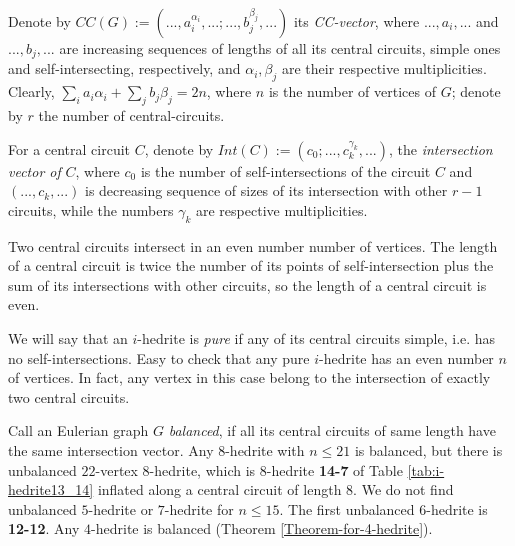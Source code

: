 \documentclass[12pt]{article}
\begin{document}


Denote by 
$CC(G):=(...,a_i^{\alpha_i},...;...,b_j^{\beta_j},...)$ its {\it CC-vector}, 
where $...,a_i,...$ and  $...,b_j,...$ are increasing sequences of lengths of 
all its central circuits, simple ones and self-intersecting, respectively, 
and $\alpha_i, \beta_j$ are their respective multiplicities.
Clearly, $\sum_{i} a_i{\alpha_i}+ \sum_{j} b_j{\beta_j}=2n$, where 
$n$ is the number of vertices of $G$; denote by $r$ the number of 
central-circuits.


For a central circuit $C$, denote by $Int(C):=(c_0;...,c_k^{\gamma_k},...)$,
the {\em intersection vector of} $C$, where $c_0$ is
the number of self-intersections of the circuit $C$ and $(...,c_k,...)$ is
decreasing sequence of sizes of its intersection with other $r-1$ 
circuits, while the numbers $\gamma_k$ are respective multiplicities.


Two central circuits intersect in an even number number of vertices. 
The length of a central circuit is twice the number of its points of 
self-intersection plus the sum of its intersections with other circuits, 
so the length of a central circuit is even.



We will say that an $i$-hedrite is {\it pure} if any of its central circuits 
simple, i.e. has no self-intersections.
Easy to check that any pure $i$-hedrite has an even number $n$ of 
vertices. In fact, any vertex in this case belong to the intersection 
of exactly two central circuits.


Call an Eulerian graph $G$ {\it balanced}, if all its central circuits of
same length have the same intersection vector.
Any $8$-hedrite with $n \le 21$ is balanced, but there is unbalanced
$22$-vertex $8$-hedrite, which is $8$-hedrite {\bf 14-7} of Table 
\ref{tab:i-hedrite13_14} inflated along a central circuit of length $8$.
We do not find unbalanced $5$-hedrite or $7$-hedrite for $n\leq 15$. The
first unbalanced $6$-hedrite is {\bf 12-12}. Any $4$-hedrite is balanced
(Theorem \ref{Theorem-for-4-hedrite}).
\end{document}
